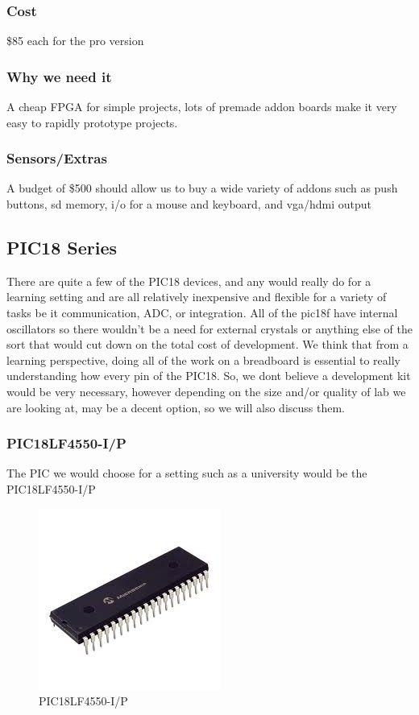 \documentclass[12pt]{article}
\begin{document}
\subsubsection{Cost}

\$85 each for the pro version

\subsubsection{Why we need it}

A cheap FPGA for simple projects, lots of premade addon boards make it very easy to rapidly prototype projects.

\subsubsection{Sensors/Extras}

A budget of \$500 should allow us to buy a wide variety of addons
such as push buttons, sd memory, i/o for a mouse and keyboard, and vga/hdmi
output

\subsection{PIC18 Series}
There are quite a few of the PIC18 devices, and any would really do for a learning setting
and are all relatively inexpensive and flexible for a variety of tasks be it communication, ADC,
or integration. All of the pic18f have internal oscillators so there wouldn't be a need for external
crystals or anything else of the sort that would cut down on the total cost of development. We
think that from a learning perspective, doing all of the work on a breadboard is essential to really
understanding how every pin of the PIC18. So, we dont believe a development kit would be very
necessary, however depending on the size and/or quality of lab we are looking at, may be a decent
option, so we will also discuss them.

\subsubsection{PIC18LF4550-I/P}

The PIC we would choose for a setting such as a university would be the
PIC18LF4550-I/P

\begin{figure}[h!]
  \centering
  \includegraphics[scale=.5]{images/pic}
  \caption{PIC18LF4550-I/P}
  \label{img:pic}
\end{figure}
\end{document}
